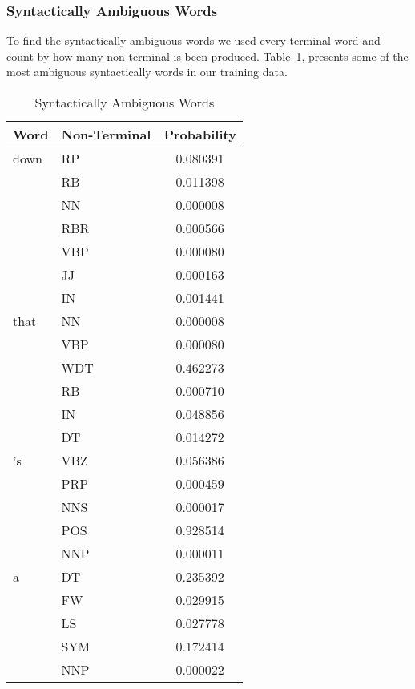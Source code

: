 \documentclass[a4paper,11pt]{article}
\begin{document}
\subsubsection{Syntactically Ambiguous Words}
To find the syntactically ambiguous words we used every terminal word and count by how many non-terminal is been produced. Table~\ref{syn}, presents some of the most ambiguous syntactically words in our training data.
\begin{table}[t!]
\label{unknown}
\caption{Syntactically Ambiguous Words}
\label{syn}
\begin{center}
\begin{tiny}
    \begin{tabular}{l l c}
    \hline
    \hline
        \textbf{Word} & \textbf{Non-Terminal} & \textbf{Probability} \\ \hline
down  &  RP  &  0.080391  \\
  &  RB  &  0.011398  \\
  &  NN  &  0.000008  \\
  &  RBR  &  0.000566  \\
  &  VBP  &  0.000080  \\
  &  JJ  &  0.000163  \\
  &  IN  &  0.001441  \vspace{0.1cm} \\
that  &  NN  &  0.000008  \\
  &  VBP  &  0.000080  \\
  &  WDT  &  0.462273  \\
  &  RB  &  0.000710  \\
  &  IN  &  0.048856  \\
  &  DT  &  0.014272  \vspace{0.1cm} \\
's  &  VBZ  &  0.056386  \\
  &  PRP  &  0.000459  \\
  &  NNS  &  0.000017  \\
  &  POS  &  0.928514  \\
  &  NNP  &  0.000011  \vspace{0.1cm} \\
a  &  DT  &  0.235392  \\
  &  FW  &  0.029915  \\
  &  LS  &  0.027778  \\
  &  SYM  &  0.172414  \\
  &  NNP  &  0.000022  \\
  \hline
  \end{tabular}
  \end{tiny}
  \end{center}
\end{table}
\end{document}
